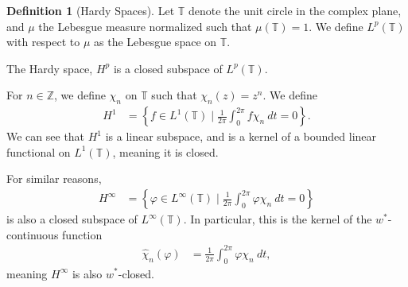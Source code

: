\documentclass[12pt]{extarticle}
\newcommand{\Z}{\mathbb{Z}}
\newcommand{\set}[1]{\left\{#1\right\}}
\theoremstyle{plain}
\theoremstyle{definition}
\newtheorem*{definition}{Definition}
\theoremstyle{note}
\renewcommand{\newline}{\hfill\break}
\begin{document}
\begin{definition}[Hardy Spaces]
  Let $\mathbb{T}$ denote the unit circle in the complex plane, and $\mu$ the Lebesgue measure normalized such that $\mu\left(\mathbb{T}\right) = 1$. We define $L^{p}\left(\mathbb{T}\right)$ with respect to $\mu$ as the Lebesgue space on $\mathbb{T}$.\newline

  The Hardy space, $H^{p}$ is a closed subspace of $L^{p}\left(\mathbb{T}\right)$.\newline

  For $n\in \Z$, we define $\chi_n$ on $\mathbb{T}$ such that $\chi_n(z) = z^n$. We define
  \begin{align*}
    H^1 &= \set{f\in L^{1}\left(\mathbb{T}\right) \mid \frac{1}{2\pi}\int_{0}^{2\pi}f\chi_n\:dt = 0}.
  \end{align*}
  We can see that $H^1$ is a linear subspace, and is a kernel of a bounded linear functional on $L^1\left(\mathbb{T}\right)$, meaning it is closed.\newline

  For similar reasons,
  \begin{align*}
    H^{\infty} &= \set{\varphi \in L^{\infty}\left(\mathbb{T}\right) \mid \frac{1}{2\pi}\int_{0}^{2\pi}\varphi \chi_n\:dt = 0}
  \end{align*}
  is also a closed subspace of $L^{\infty}\left(\mathbb{T}\right)$. In particular, this is the kernel of the $w^{\ast}$-continuous function
  \begin{align*}
    \hat{\chi}_n\left(\varphi\right) &= \frac{1}{2\pi}\int_{0}^{2\pi} \varphi \chi_n\:dt,
  \end{align*}
  meaning $H^{\infty}$ is also $w^{\ast}$-closed.
\end{definition}
\end{document}
